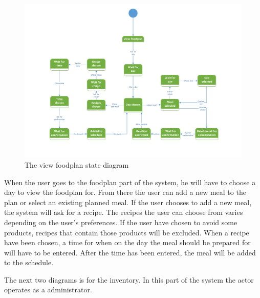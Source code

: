 \begin{figure}[H]
	\centering
	\includegraphics[width=1.0\textwidth]{ApplicationDomain/spViewFoodPlan.pdf} 
	\caption{The view foodplan state diagram}
	\label{Foodplan_Figure}
\end{figure}
When the user goes to the foodplan part of the system, he will have to choose a day to view the foodplan for. From there the user can add a new meal to the plan or select an existing planned meal. If the user chooses to add a new meal, the system will ask for a recipe. The recipes the user can choose from varies depending on the user's preferences. If the user have chosen to avoid some products, recipes that contain those products will be excluded. When a recipe have been chosen, a time for when on the day the meal should be prepared for will have to be entered. After the time has been entered, the meal will be added to the schedule.


The next two diagrams is for the inventory. In this part of the system the actor operates as a administrator.

